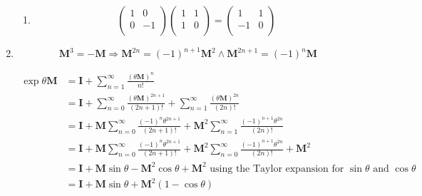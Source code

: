 \documentclass[10pt,oneside,a4paper]{article}
\begin{document}
\begin{enumerate}
\begin{enumerate}
\item 

\[
\begin{pmatrix} 1 & 0 \\ 0 & -1 \\ \end{pmatrix} \begin{pmatrix} 1 & 1 \\ 1 & 0 \\ \end{pmatrix} = \begin{pmatrix} 1 & 1 \\ -1 & 0 \\ \end{pmatrix}
\]

\end{enumerate}

\item 

\[
\mathbf{M}^3 = -\mathbf{M} \Longrightarrow \mathbf{M}^{2n} = (-1)^{n + 1}\mathbf{M}^2 \wedge \mathbf{M}^{2n + 1} = (-1)^{n}\mathbf{M}
\]

\[
\begin{split}
\exp\theta\mathbf{M} &= \mathbf{I} + \sum^\infty_{n=1}\frac{(\theta\mathbf{M})^n}{n!} \\
                           &= \mathbf{I} + \sum^\infty_{n=0}\frac{(\theta\mathbf{M})^{2n + 1}}{(2n + 1)!} + \sum^\infty_{n=1}\frac{(\theta\mathbf{M})^{2n}}{(2n)!} \\
                           &= \mathbf{I} + \mathbf{M}\sum^\infty_{n=0}\frac{(-1)^n\theta^{2n + 1}}{(2n + 1)!} + \mathbf{M}^2\sum^\infty_{n=1}\frac{(-1)^{n + 1}\theta^{2n}}{(2n)!} \\
                           &= \mathbf{I} + \mathbf{M}\sum^\infty_{n=0}\frac{(-1)^n\theta^{2n + 1}}{(2n + 1)!} + \mathbf{M}^2\sum^\infty_{n=0}\frac{(-1)^{n + 1}\theta^{2n}}{(2n)!} + \mathbf{M}^2 \\
                           &= \mathbf{I} + \mathbf{M}\sin\theta - \mathbf{M}^2\cos\theta + \mathbf{M}^2 \text{ using the Taylor expansion for } \sin\theta \text{ and } \cos\theta \\
                           &= \mathbf{I} + \mathbf{M}\sin\theta + \mathbf{M}^2(1 - \cos\theta) \\
\end{split}
\]


\end{enumerate}
\end{document}

